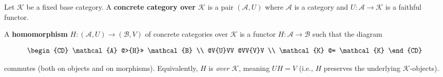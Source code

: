 Let $\mathcal{K}$ be a fixed base category. A \textbf{concrete category over $\mathcal{K}$} is a pair $(\mathcal{A}, U)$ where $\mathcal{A}$ is a category and $U: \mathcal{A} \to \mathcal{K}$ is a faithful functor.

A \textbf{homomorphism} $H: (\mathcal{A}, U) \to (\mathcal{B}, V)$ of concrete categories over $\mathcal{K}$ is a functor $H: \mathcal{A} \to \mathcal{B}$ such that the diagram

\[
\begin{CD}
\mathcal{A} @>{H}>> \mathcal{B} \\
@V{U}VV @VV{V}V \\
\mathcal{K} @= \mathcal{K}
\end{CD}
\]

commutes (both on objects and on morphisms). Equivalently, $H$ is \emph{over $\mathcal{K}$}, meaning $UH = V$ (i.e., $H$ preserves the underlying $\mathcal{K}$-objects).

